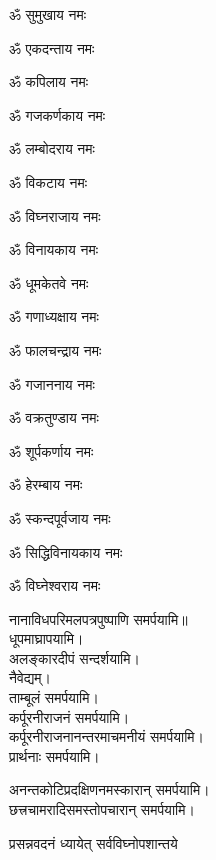 \begin{enumerate}%
\begin{minipage}{0.475\linewidth}
\item ॐ सुमुखाय नमः
\item ॐ एकदन्ताय नमः
\item ॐ कपिलाय नमः
\item ॐ गजकर्णकाय नमः
\item ॐ लम्बोदराय नमः
\item ॐ विकटाय नमः
\item ॐ विघ्नराजाय नमः
\item ॐ विनायकाय नमः
\item ॐ धूमकेतवे नमः
\end{minipage}
\begin{minipage}{0.525\linewidth}
\item ॐ गणाध्यक्षाय नमः
\item ॐ फालचन्द्राय नमः
\item ॐ गजाननाय नमः
\item ॐ वक्रतुण्डाय नमः
\item ॐ शूर्पकर्णाय नमः
\item ॐ हेरम्बाय नमः
\item ॐ स्कन्दपूर्वजाय नमः
\item ॐ सिद्धिविनायकाय नमः
\item ॐ विघ्नेश्वराय नमः
\end{minipage}
\end{enumerate}
नानाविधपरिमलपत्रपुष्पाणि समर्पयामि॥\\
धूपमाघ्रापयामि।\\
अलङ्कारदीपं सन्दर्शयामि।\\
नैवेद्यम्।\\
ताम्बूलं समर्पयामि।\\
कर्पूरनीराजनं समर्पयामि।\\
कर्पूरनीराजनानन्तरमाचमनीयं समर्पयामि।\\

प्रार्थनाः समर्पयामि।

अनन्तकोटिप्रदक्षिणनमस्कारान् समर्पयामि।\\
छत्त्रचामरादिसमस्तोपचारान् समर्पयामि।\\


{प्रसन्नवदनं ध्यायेत् सर्वविघ्नोपशान्तये}

